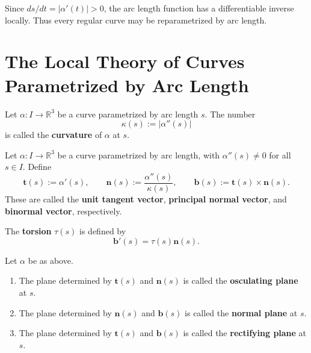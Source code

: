 \documentclass[12pt, oneside]{book}
\begin{document}
\begin{remark}
    Since $ds/dt=|\alpha'(t)|>0$, the arc length function has a differentiable
    inverse locally.  Thus every regular curve may be reparametrized by arc
    length.
\end{remark}


\section{The Local Theory of Curves Parametrized by Arc Length}

\begin{definition}
    Let $\alpha:I\rightarrow \mathbb{R}^3$ be a curve parametrized by arc
    length $s$.  The number
    \[
        \kappa(s):=|\alpha''(s)|
    \]
    is called the \textbf{curvature} of $\alpha$ at $s$.
\end{definition}

\begin{definition}
    Let $\alpha:I\rightarrow \mathbb{R}^3$ be a curve parametrized by arc
    length, with $\alpha''(s)\neq 0$ for all $s\in I$.  Define
    \[
        \mathbf{t}(s):=\alpha'(s),\qquad
        \mathbf{n}(s):=\frac{\alpha''(s)}{\kappa(s)},\qquad
        \mathbf{b}(s):=\mathbf{t}(s)\times \mathbf{n}(s).
    \]
    These are called the \textbf{unit tangent vector}, \textbf{principal normal
        vector}, and \textbf{binormal vector}, respectively.
\end{definition}

\begin{definition}
    The \textbf{torsion} $\tau(s)$ is defined by
    \[
        \mathbf{b}'(s)=\tau(s)\mathbf{n}(s).
    \]
\end{definition}

\begin{definition}
    Let $\alpha$ be as above.
    \begin{enumerate}
        \item The plane determined by $\mathbf{t}(s)$ and $\mathbf{n}(s)$ is
              called the \textbf{osculating plane} at $s$.
        \item The plane determined by $\mathbf{n}(s)$ and $\mathbf{b}(s)$ is
              called the \textbf{normal plane} at $s$.
        \item The plane determined by $\mathbf{t}(s)$ and $\mathbf{b}(s)$ is
              called the \textbf{rectifying plane} at $s$.
    \end{enumerate}
\end{definition}
\end{document}

